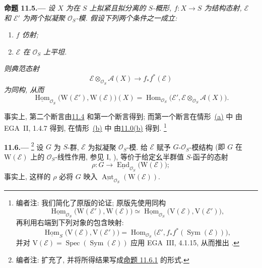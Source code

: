 \medskip
{}\label{prop:sga3-VIB-11.5}%
\noindent\textbf{命题 11.5.---}
\emph{设 \(X\) 为在 \(S\) 上拟紧且拟分离的 \(S\)-概形,
\(f:X\to S\) 为结构态射,
\(\mathcal E\) 和 \(\mathcal E'\) 为两个拟凝聚 \(\mathcal O_S\)-模.
假设下列两个条件之一成立:}
\begin{enumerate}
\item[\textup{a)}]\label{concl:sga3-VIB-11.5-a}
  \emph{\(f\) 仿射;}

\item[\textup{b)}]\label{concl:sga3-VIB-11.5-b}
  \emph{\(\mathcal E\) 在 \(\mathcal O_S\) 上平坦.}
\end{enumerate}
\emph{则典范态射}
\label{form:sga3-VIB-11.5-projection}%
\[
  \mathcal E\otimes_{\mathcal O_S}\mathcal A(X)
    \longrightarrow f_*f^*(\mathcal E)
\]
\emph{为同构, 从而}
\label{form:sga3-VIB-11.5-Hom}%
\[
  \underline{\operatorname{Hom}}_{\mathcal O_S}
    \bigl(\mathrm W(\mathcal E'),\mathrm W(\mathcal E)\bigr)(X)
  =
  \operatorname{Hom}_{\mathcal O_S}
    \bigl(\mathcal E',
          \mathcal E\otimes_{\mathcal O_S}\mathcal A(X)\bigr).
\]

事实上, 第二个断言由\hyperref[par:sga3-VIB-11.4]{11.4} 和第一个断言得到;
而第一个断言在情形~\hyperref[concl:sga3-VIB-11.5-a]{\textup{(a)}} 中
由 EGA~II, 1.4.7 得到,
在情形~\hyperref[concl:sga3-VIB-11.5-b]{\textup{(b)}} 中
由\hyperref[concl:sga3-VIB-11.0-b]{11.0\textup{(b)}} 得到.%
\footnote{\label{note:sga3-VIB-109}编者注: 我们简化了原版的论证; 原版先使用同构
\[
  \underline{\operatorname{Hom}}_{\mathcal O_S}
    \bigl(\mathrm W(\mathcal E'),\mathrm W(\mathcal E)\bigr)
  \simeq
  \underline{\operatorname{Hom}}_{\mathcal O_S}
    \bigl(\mathrm V(\mathcal E),\mathrm V(\mathcal E')\bigr),
\]
再利用右端到下列对象的包含映射:
\[
  \underline{\operatorname{Hom}}_S
    \bigl(\mathrm V(\mathcal E),\mathrm V(\mathcal E')\bigr)
  =
  \operatorname{Hom}_{\mathcal O_S}
    \bigl(\mathcal E',
          f_*f^*(\operatorname{Sym}(\mathcal E))\bigr),
\]
并对 \(\mathrm V(\mathcal E)=
  \operatorname{Spec}(\operatorname{Sym}(\mathcal E))\)
应用 EGA~III, 4.1.15, 从而推出
\textup{}.}

\medskip
{}\label{par:sga3-VIB-11.6}%
\noindent\textbf{11.6.---}%
\footnote{\label{note:sga3-VIB-110}编者注: 扩充了,
并将所得结果写成\hyperref[prop:sga3-VIB-11.6.1]{命题 11.6.1} 的形式.}
设 \(G\) 为 \(S\)-群, \(\mathcal E\) 为拟凝聚 \(\mathcal O_S\)-模.
给 \(\mathcal E\) 赋予 \(G\)-\(\mathcal O_S\)-模结构
\textup{(即 \(G\) 在 \(\mathrm W(\mathcal E)\) 上的 \(\mathcal O_S\)-线性作用,
参见 I, )},
等价于给定幺半群值 \(S\)-函子的态射
\label{form:sga3-VIB-11.6-rho}%
\[
  \rho:G\longrightarrow
  \underline{\operatorname{End}}_{\mathcal O_S}
    \bigl(\mathrm W(\mathcal E)\bigr);
\]
事实上, 这样的 \(\rho\) 必将 \(G\) 映入
\(\underline{\operatorname{Aut}}_{\mathcal O_S}
  (\mathrm W(\mathcal E))\).

